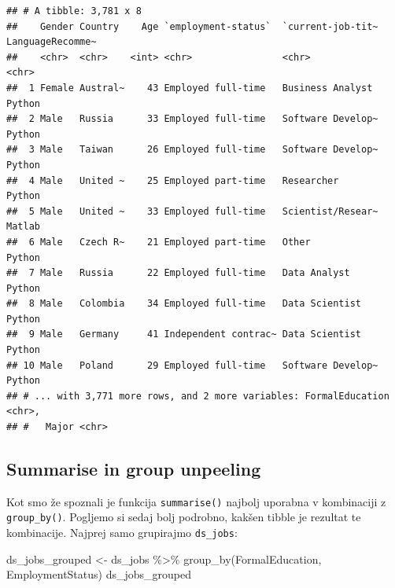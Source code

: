 \documentclass[
]{book}
\newenvironment{Shaded}{\begin{snugshade}}{\end{snugshade}}
\newcommand{\FunctionTok}[1]{\textcolor[rgb]{0.00,0.00,0.00}{#1}}
\newcommand{\NormalTok}[1]{#1}
\newcommand{\OtherTok}[1]{\textcolor[rgb]{0.56,0.35,0.01}{#1}}
\newcommand{\SpecialCharTok}[1]{\textcolor[rgb]{0.00,0.00,0.00}{#1}}
\begin{document}
\begin{verbatim}
## # A tibble: 3,781 x 8
##    Gender Country    Age `employment-status`  `current-job-tit~ LanguageRecomme~
##    <chr>  <chr>    <int> <chr>                <chr>             <chr>           
##  1 Female Austral~    43 Employed full-time   Business Analyst  Python          
##  2 Male   Russia      33 Employed full-time   Software Develop~ Python          
##  3 Male   Taiwan      26 Employed full-time   Software Develop~ Python          
##  4 Male   United ~    25 Employed part-time   Researcher        Python          
##  5 Male   United ~    33 Employed full-time   Scientist/Resear~ Matlab          
##  6 Male   Czech R~    21 Employed part-time   Other             Python          
##  7 Male   Russia      22 Employed full-time   Data Analyst      Python          
##  8 Male   Colombia    34 Employed full-time   Data Scientist    Python          
##  9 Male   Germany     41 Independent contrac~ Data Scientist    Python          
## 10 Male   Poland      29 Employed full-time   Software Develop~ Python          
## # ... with 3,771 more rows, and 2 more variables: FormalEducation <chr>,
## #   Major <chr>
\end{verbatim}

\hypertarget{summarise-in-group-unpeeling}{%
\subsection{Summarise in group unpeeling}\label{summarise-in-group-unpeeling}}

Kot smo že spoznali je funkcija \texttt{summarise()} najbolj uporabna v kombinaciji z \texttt{group\_by()}. Pogljemo si sedaj bolj podrobno, kakšen tibble je rezultat te kombinacije. Najprej samo grupirajmo \texttt{ds\_jobs}:

\begin{Shaded}
\begin{Highlighting}[]
\NormalTok{ds\_jobs\_grouped }\OtherTok{\textless{}{-}}\NormalTok{ ds\_jobs }\SpecialCharTok{\%\textgreater{}\%}
  \FunctionTok{group\_by}\NormalTok{(FormalEducation, EmploymentStatus)}
\NormalTok{ds\_jobs\_grouped}
\end{Highlighting}
\end{Shaded}
\end{document}
